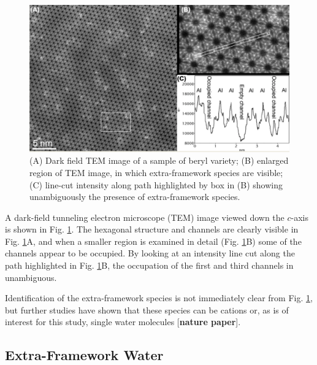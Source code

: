         \begin{figure}
            \centering
            \includegraphics[width=0.9\linewidth]{Figures/System/beryl_tem.png}
            \caption{(A) Dark field TEM image of a sample of beryl variety; (B) enlarged region of TEM image, in which extra-framework species are visible; (C) line-cut intensity along path highlighted by box in (B) showing unambiguously the presence of extra-framework species.}
            \label{fig:beryl_tem}
        \end{figure}
        
        A dark-field tunneling electron microscope (TEM) image viewed down the $c$-axis is shown in Fig. \ref{fig:beryl_tem}. The hexagonal structure and channels are clearly visible in Fig. \ref{fig:beryl_tem}A, and when a smaller region is examined in detail (Fig. \ref{fig:beryl_tem}B) some of the channels appear to be occupied. By looking at an intensity line cut along the path highlighted in Fig. \ref{fig:beryl_tem}B, the occupation of the first and third channels in unambiguous. 
        
        Identification of the extra-framework species is not immediately clear from Fig. \ref{fig:beryl_tem}, but further studies have shown that these species can be cations or, as is of interest for this study, single water molecules [\textbf{nature paper}].
        
        \subsection{Extra-Framework Water}
        
